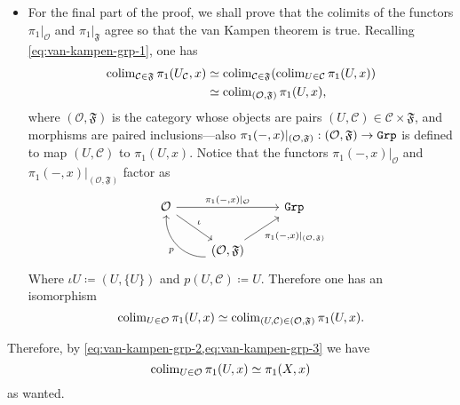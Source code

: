 \begin{itemize}
\item For the final part of the proof, we shall prove that the colimits of the
  functors \(\pi_1|_{\mathcal{O}}\) and \(\pi_1|_{\mathfrak{F}}\) agree so that
  the van Kampen theorem is true. Recalling \cref{eq:van-kampen-grp-1}, one has
  \begin{align*}
  \operatorname{colim}_{\mathcal{C} \in \mathfrak{F}} \pi_1(U_{\mathcal{C}}, x)
  &\simeq
  \operatorname{colim}_{\mathcal{C} \in \mathfrak{F}}(\operatorname{colim}_{U \in \mathcal{C}} \pi_1(U, x)) \\
  &\simeq
  \operatorname{colim}_{(\mathcal{O}, \mathfrak{F})} \pi_1(U, x),
  \end{align*}
  where \((\mathcal{O}, \mathfrak{F})\) is the category whose objects are pairs
  \((U, \mathcal{C}) \in \mathcal{C} \times \mathfrak{F}\), and morphisms are
  paired inclusions---also
  \(\pi_1(-, x)|_{(\mathcal{O}, \mathfrak{F})}: (\mathcal{O}, \mathfrak{F}) \to
  {\texttt{Grp}}\) is defined to map \((U, \mathcal{C})\) to \(\pi_1(U, x)\). Notice that
  the functors \(\pi_1(-, x)|_{\mathcal{O}}\) and
  \(\pi_1(-, x)|_{(\mathcal{O}, \mathfrak{F})}\) factor as
  \[
  \begin{tikzcd}
  \mathcal{O} \ar[rr, "\pi_1{(-, x)}|_{\mathcal{O}}"] \ar[rd, "\iota"]
  & &\Grp \\
  &(\mathcal{O}, \mathfrak{F})
  \ar[ru, "\pi_1{(-, x)}|_{(\mathcal{O}, \mathfrak F)}"']
  \ar[lu, bend left=50, "p"] &
  \end{tikzcd}
  \]
  Where \(\iota U \coloneq (U, \{U\})\) and \(p (U, \mathcal{C}) \coloneq
  U\). Therefore one has an isomorphism
  \begin{equation}\label{eq:van-kampen-grp-3}
  \operatorname{colim}_{U \in \mathcal{O}} \pi_1(U, x)
  \simeq
  \operatorname{colim}_{(U, \mathcal{C}) \in (\mathcal{O}, \mathfrak F)} \pi_1(U, x).
  \end{equation}
\end{itemize}
Therefore, by \cref{eq:van-kampen-grp-2,eq:van-kampen-grp-3} we have
\[
\operatorname{colim}_{U \in \mathcal{O}} \pi_1(U, x) \simeq \pi_1(X, x)
\]
as wanted.

